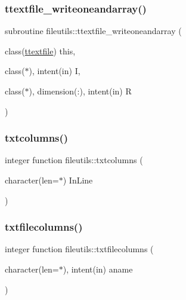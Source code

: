 \mbox{\label{namespacefileutils_a8673cc2b2bcfe0639966d2789c1bbade}} 
\subsubsection{\texorpdfstring{ttextfile\+\_\+writeoneandarray()}{ttextfile\_writeoneandarray()}}
{\footnotesize\ttfamily subroutine fileutils\+::ttextfile\+\_\+writeoneandarray (\begin{DoxyParamCaption}\item[{class(\mbox{\hyperlink{structfileutils_1_1ttextfile}{ttextfile}})}]{this,  }\item[{class($\ast$), intent(in)}]{I,  }\item[{class($\ast$), dimension(\+:), intent(in)}]{R }\end{DoxyParamCaption})\hspace{0.3cm}{\ttfamily [private]}}

\mbox{\label{namespacefileutils_a704f148cd0ca7af88eec65d167460683}} 
\subsubsection{\texorpdfstring{txtcolumns()}{txtcolumns()}}
{\footnotesize\ttfamily integer function fileutils\+::txtcolumns (\begin{DoxyParamCaption}\item[{character(len=$\ast$)}]{In\+Line }\end{DoxyParamCaption})\hspace{0.3cm}{\ttfamily [private]}}

\mbox{\label{namespacefileutils_aef4950c08afd7c3cd6edffdb879a81f3}} 
\subsubsection{\texorpdfstring{txtfilecolumns()}{txtfilecolumns()}}
{\footnotesize\ttfamily integer function fileutils\+::txtfilecolumns (\begin{DoxyParamCaption}\item[{character(len=$\ast$), intent(in)}]{aname }\end{DoxyParamCaption})\hspace{0.3cm}{\ttfamily [private]}}

